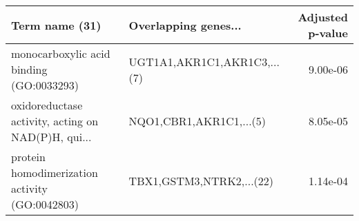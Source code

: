 \begin{tabular}{llr}
\toprule
                                    Term name (31) &        Overlapping genes... &  Adjusted p-value \\
\midrule
          monocarboxylic acid binding (GO:0033293) & UGT1A1,AKR1C1,AKR1C3,...(7) &          9.00e-06 \\
oxidoreductase activity, acting on NAD(P)H, qui... &     NQO1,CBR1,AKR1C1,...(5) &          8.05e-05 \\
    protein homodimerization activity (GO:0042803) &    TBX1,GSTM3,NTRK2,...(22) &          1.14e-04 \\
\bottomrule
\end{tabular}
